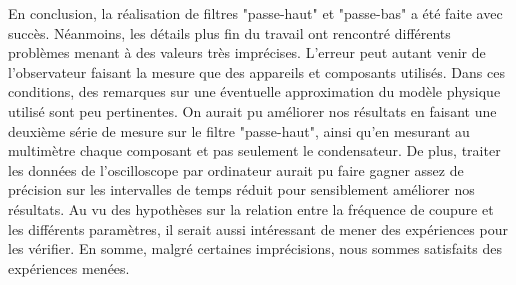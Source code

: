 En conclusion, la réalisation de filtres "passe-haut" et "passe-bas" a été faite avec succès. Néanmoins, les détails plus fin du travail ont rencontré différents problèmes menant à des valeurs très imprécises. L'erreur peut autant venir de l'observateur faisant la mesure que des appareils et composants utilisés. Dans ces conditions, des remarques sur une éventuelle approximation du modèle physique utilisé sont peu pertinentes. On aurait pu améliorer nos résultats en faisant une deuxième série de mesure sur le filtre "passe-haut", ainsi qu'en mesurant au multimètre chaque composant et pas seulement le condensateur. De plus, traiter les données de l'oscilloscope par ordinateur aurait pu faire gagner assez de précision sur les intervalles de temps réduit pour sensiblement améliorer nos résultats. Au vu des hypothèses sur la relation entre la fréquence de coupure et les différents paramètres, il serait aussi intéressant de mener des expériences pour les vérifier. En somme, malgré certaines imprécisions, nous sommes satisfaits des expériences menées.